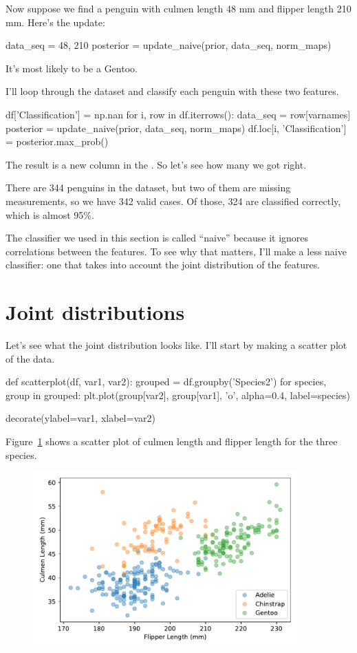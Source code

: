 \documentclass[12pt]{book}
\theoremstyle{exercise}
\begin{document}
Now suppose we find a penguin with culmen length 48 mm and flipper
length 210 mm. Here's the update:

\begin{code}
data_seq = 48, 210
posterior = update_naive(prior, data_seq, norm_maps)
\end{code}

It's most likely to be a Gentoo.

I'll loop through the dataset and classify each penguin with these two
features.

\begin{code}
df['Classification'] = np.nan
for i, row in df.iterrows():
    data_seq = row[varnames]
    posterior = update_naive(prior, data_seq, norm_maps)
    df.loc[i, 'Classification'] = posterior.max_prob()
\end{code}

The result is a new column in the .
So let's see how many we got right.

There are 344 penguins in the dataset, but two of them are missing
measurements, so we have 342 valid cases.
Of those, 324 are classified correctly, which is almost 95\%.

The classifier we used in this section is called ``naive'' because it
ignores correlations between the features. To see why that matters, I'll
make a less naive classifier: one that takes into account the joint
distribution of the features.

\section{Joint distributions}
\label{joint-distributions}

Let's see what the joint distribution looks like.
I'll start by making a scatter plot of the data.

\begin{code}
def scatterplot(df, var1, var2):
    grouped = df.groupby('Species2')
    for species, group in grouped:
        plt.plot(group[var2], group[var1], 'o',
                 alpha=0.4, label=species)
    
    decorate(ylabel=var1, xlabel=var2)
\end{code}

Figure~\ref{fig01-02} shows a scatter plot of culmen length and flipper length for the three
species.

\begin{figure}
\centerline{\includegraphics[width=4in]{figs/fig10-02.pdf}}
\caption{}
\label{fig01-02}
\end{figure}
\end{document}
